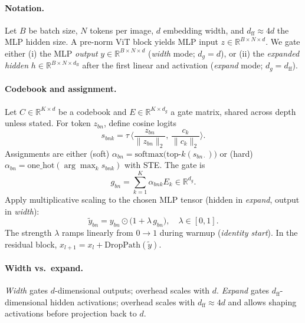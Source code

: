 \documentclass[11pt]{article}
\begin{document}
\paragraph{Notation.}
Let $B$ be batch size, $N$ tokens per image, $d$ embedding width, and $d_{\mathrm{ff}}\!\approx\!4d$ the MLP hidden size. A pre-norm ViT block yields MLP input $z\in\mathbb{R}^{B\times N\times d}$. We gate either (i) the MLP \emph{output} $y\in\mathbb{R}^{B\times N\times d}$ (\emph{width} mode; $d_g=d$), or (ii) the \emph{expanded hidden} $h\in\mathbb{R}^{B\times N\times d_{\mathrm{ff}}}$ after the first linear and activation (\emph{expand} mode; $d_g=d_{\mathrm{ff}}$).

\paragraph{Codebook and assignment.}
Let $C\in\mathbb{R}^{K\times d}$ be a codebook and $E\in\mathbb{R}^{K\times d_g}$ a gate matrix, shared across depth unless stated. For token $z_{bn}$, define cosine logits
\begin{equation}
  s_{bnk} = \tau\,\Big\langle \frac{z_{bn}}{\|z_{bn}\|_2},\, \frac{c_k}{\|c_k\|_2}\Big\rangle. \label{eq:logits}
\end{equation}
Assignments are either (soft) $\alpha_{bn}=\mathrm{softmax}\!\big(\mathrm{top}\textrm{-}k(s_{bn\cdot})\big)$ or (hard) $\alpha_{bn}=\mathrm{one\_hot}(\arg\max_k s_{bnk})$ with STE. The gate is
\begin{equation}
  g_{bn}=\sum_{k=1}^K \alpha_{bnk} E_k \in \mathbb{R}^{d_g}. \label{eq:gate}
\end{equation}
Apply multiplicative scaling to the chosen MLP tensor (hidden in \emph{expand}, output in \emph{width}):
\begin{equation}
  \tilde y_{bn} = y_{bn} \odot \big(1 + \lambda\, g_{bn}\big), \quad \lambda\in[0,1].
\end{equation}
The strength $\lambda$ ramps linearly from $0\rightarrow 1$ during warmup (\emph{identity start}). In the residual block, $x_{l+1} = x_l + \mathrm{DropPath}(\tilde y)$.

\paragraph{Width vs.\ expand.}
\emph{Width} gates $d$-dimensional outputs; overhead scales with $d$. \emph{Expand} gates $d_{\mathrm{ff}}$-dimensional hidden activations; overhead scales with $d_{\mathrm{ff}}\!\approx\!4d$ and allows shaping activations before projection back to $d$.
\end{document}
